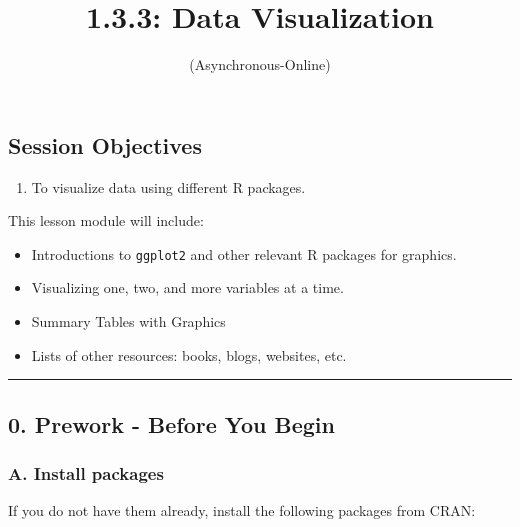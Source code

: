 \documentclass[
  letterpaper,
  DIV=11,
  numbers=noendperiod]{scrartcl}
\title{1.3.3: Data Visualization}
\subtitle{(Asynchronous-Online)}
\author{}
\date{}
\providecommand{\tightlist}{%
  \setlength{\itemsep}{0pt}\setlength{\parskip}{0pt}}\usepackage{longtable,booktabs,array}
\begin{document}
\maketitle


\thispagestyle{fancy}

\subsection{Session Objectives}\label{session-objectives}

\begin{enumerate}
\def\labelenumi{\arabic{enumi}.}
\tightlist
\item
  To visualize data using different R packages.
\end{enumerate}

This lesson module will include:

\begin{itemize}
\tightlist
\item
  Introductions to \texttt{ggplot2} and other relevant R packages for
  graphics.
\item
  Visualizing one, two, and more variables at a time.
\item
  Summary Tables with Graphics
\item
  Lists of other resources: books, blogs, websites, etc.
\end{itemize}

\begin{center}\rule{0.5\linewidth}{0.5pt}\end{center}

\subsection{0. Prework - Before You
Begin}\label{prework---before-you-begin}

\subsubsection{A. Install packages}\label{a.-install-packages}

If you do not have them already, install the following packages from
CRAN:
\end{document}

